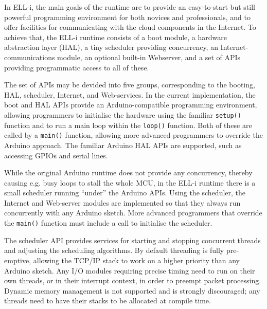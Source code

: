 \documentclass[final]{siamltex}
\begin{document}
In ELL-i, the main goals of the runtime are to provide an
easy-to-start but still powerful programming environment for both
novices and professionals, and to offer facilities for communicating
with the cloud components in the Internet.  To achieve that, the ELL-i
runtime consists of a boot module, a hardware abstraction layer (HAL),
a tiny scheduler providing concurrency, an Internet-communications
module, an optional built-in Webserver, and a set of APIs providing
programmatic access to all of these.


The set of APIs may be devided into five groups, corresponding to the
booting, HAL, scheduler, Internet, and Web-services.  In the current
implementation, the boot and HAL APIs provide an Arduino-compatible
programming environment, allowing programmers to initialise the
hardware using the familiar \hbox{\tt setup()} function and to run a
main loop within the \hbox{\tt loop()} function.  Both of these are
called by a \hbox{\tt main()} function, allowing more advanced
programmers to override the Arduino approach.  The familiar Arduino
HAL APIs are supported, such as accessing GPIOs and serial lines.

While the original Arduino runtime does not provide any concurrency,
thereby causing e.g. busy loops to stall the whole MCU, in the ELL-i
runtime there is a small scheduler running ``under'' the Arduino
APIs.  Using the scheduler, the Internet and Web-server modules are
implemented so that they always run concurrently with any Arduino
sketch.  More advanced programmers that override the \hbox{\tt main()}
function must include a call to initialise the scheduler.

The scheduler API provides services for starting and stopping concurrent
threads and adjusting the scheduling algorithms.  By default threading
is fully pre-emptive, allowing the TCP/IP stack to work on a higher
priority than any Arduino sketch.  Any I/O modules requiring precise
timing need to run on their own threads, or in their interrupt
context, in order to preempt packet processing.  Dynamic memory
management is not supported and is strongly discouraged; any threads
need to have their stacks to be allocated at compile time.
\end{document}
